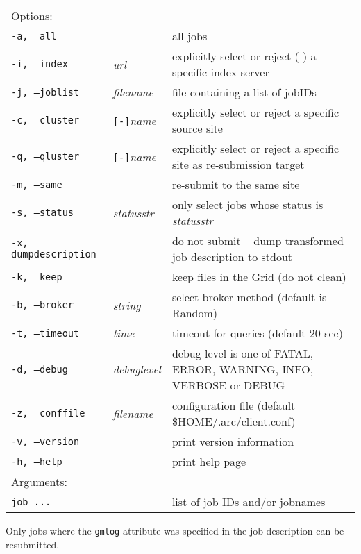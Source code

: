 \hspace*{0.5cm}
\begin{shaded}
\end{shaded}
\begin{longtable}{llp{8cm}}
   Options:&&\\
   \texttt{-a, --all}& & all jobs\\
   \texttt{-i, --index}&\textit{url}&explicitly select or reject (-) a specific index server\\
   \texttt{-j, --joblist}& \textit{filename} & file containing a list of jobIDs\\
   \texttt{-c, --cluster}&\verb#[-]#\textit{name}&explicitly select or reject a specific source site\\
   \texttt{-q, --qluster}&\verb#[-]#\textit{name}&explicitly select or reject a specific site as re-submission target\\
   \texttt{-m, --same}& &re-submit to the same site\\
   \texttt{-s, --status}& \textit{statusstr} &only select jobs whose status is \textit{statusstr}\\
   \texttt{-x, --dumpdescription}&&do not submit -- dump transformed job description to stdout\\
   \texttt{-k, --keep}& & keep files in the Grid (do not clean)\\
   \texttt{-b, --broker}&\textit{string}&select broker method (default is Random)\\
   \texttt{-t, --timeout}& \textit{time} & timeout for queries (default 20 sec)\\
   \texttt{-d, --debug}& \textit{debuglevel}&debug level is one of  FATAL, ERROR, WARNING, INFO, VERBOSE or DEBUG\\
   \texttt{-z, --conffile}&\textit{filename}& configuration file (default {\$}HOME/.arc/client.conf)\\
   \texttt{-v, --version}& & print version information\\
   \texttt{-h, --help}& & print help page\\
   Arguments:&&\\
   \texttt{job ...} && list of job IDs and/or jobnames\\
\end{longtable}

\begin{framed}
   Only jobs where the \verb#gmlog# attribute was
   specified in the job description can be resubmitted.
\end{framed}

